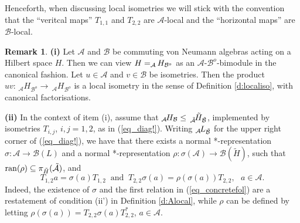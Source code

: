 \documentclass[11pt]{amsart}
\theoremstyle{definition}
\newtheorem{remark}[theorem]{Remark}
\newcommand{\cl}[1]{\mathcal{#1}}
\begin{document}
Henceforth, when discussing local isometries we will stick with the convention that the ``veritcal maps'' $T_{1,1}$ and $T_{2,2}$ are $\cl{A}$-local and the ``horizontal maps'' are $\cl{B}$-local.


\begin{remark}\label{r_preciselo}
\rm 
{\bf (i) } 
Let $\cl{A}$ and $\cl{B}$ be commuting von Neumann algebras acting on a Hilbert space $H$. Then we can view $H=_\cl{A}\hspace{-0.04cm}H_{\cl{B}^o}$ as an $\cl{A}$-$\cl{B}^{o}$-bimodule in the canonical fashion. Let $u\in \cl{A}$ and $v\in \cl{B}$ be isometries. Then the product 
$uv: \, _\cl{A}H_{\cl{B}^o}\to \,  _\cl{A}H_{\cl{B}^o}$ is a local isometry in the sense of Definition \ref{d:localiso}, with canonical factorisations.

\smallskip

{\bf (ii) } 
In the context of item (i), assume that 
$_{\cl{A}}\hspace{-0.04cm}H_{\cl{B}}\leq\, 
_{\tilde{\cl{A}}}\hspace{-0.04cm}\tilde{H}_{\tilde{\cl{B}}}$, 
implemented by isometries $T_{i,j}$, $i,j = 1,2$, as in (\ref{eq_diag!}). 
Writing $_{\cl{A}}\hspace{-0.04cm}L_{\tilde{\cl{B}}}$ for the 
upper right corner of (\ref{eq_diag!}), we have that there 
exists a normal *-representation $\sigma : \cl A \to \cl B(L)$ 
and a normal *-representation $\rho : \sigma(\cl A)\to \cl B(\tilde{H})$, 
such that ${\rm ran}(\rho) \subseteq \pi_{\tilde{H}}(\tilde{\cl A})$, and 
\begin{equation}\label{eq_concretefol}
T_{1,2} a = \sigma(a) T_{1,2} \ \mbox{ and } \ 
T_{2,2} \sigma(a) = \rho(\sigma(a)) T_{2,2}, \ \ \ a\in \cl A.
\end{equation}
Indeed, the existence of $\sigma$ and the first relation in (\ref{eq_concretefol}) 
are a restatement of condition (ii') in Definition \ref{d:Alocal},
while $\rho$ can be defined by letting 
$\rho(\sigma(a)) = T_{2,2} \sigma(a) T_{2,2}^*$, $a\in \cl A$. 
\end{remark}
\end{document}
